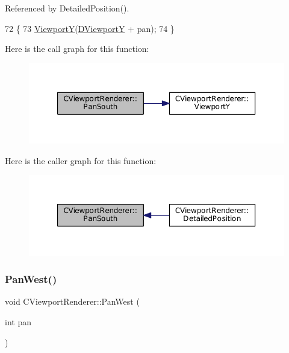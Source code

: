 Referenced by Detailed\+Position().


\begin{DoxyCode}
72                                        \{
73     \hyperlink{classCViewportRenderer_add3d4da286927abe2f19fbb37fd42ed5}{ViewportY}(\hyperlink{classCViewportRenderer_ae13dd437a3da3d2bab16bc7ba61cb78f}{DViewportY} + pan);
74 \}
\end{DoxyCode}
Here is the call graph for this function\+:\nopagebreak
\begin{figure}[H]
\begin{center}
\leavevmode
\includegraphics[width=350pt]{classCViewportRenderer_ad4aa68d96923dbea1bfd9ae3f23a3132_cgraph}
\end{center}
\end{figure}
Here is the caller graph for this function\+:\nopagebreak
\begin{figure}[H]
\begin{center}
\leavevmode
\includegraphics[width=350pt]{classCViewportRenderer_ad4aa68d96923dbea1bfd9ae3f23a3132_icgraph}
\end{center}
\end{figure}
\hypertarget{classCViewportRenderer_aa09c1b984311f77ea1cdcdc74a7a0316}{}\label{classCViewportRenderer_aa09c1b984311f77ea1cdcdc74a7a0316} 
\subsubsection{\texorpdfstring{Pan\+West()}{PanWest()}}
{\footnotesize\ttfamily void C\+Viewport\+Renderer\+::\+Pan\+West (\begin{DoxyParamCaption}\item[{int}]{pan }\end{DoxyParamCaption})}



